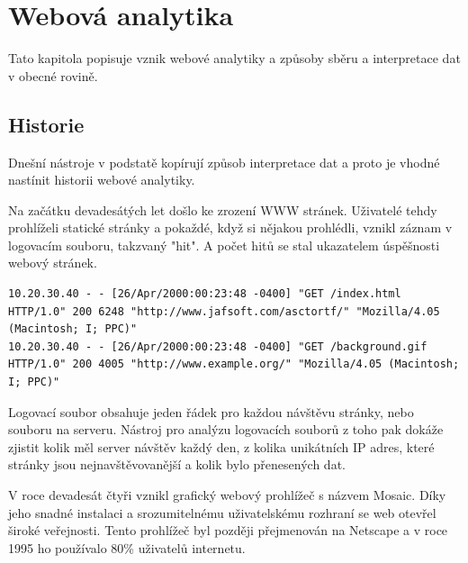 \documentclass[bc,male,java,dept456]{diploma}						%
\begin{document}

\section{Webová analytika}

Tato kapitola popisuje vznik webové analytiky a způsoby sběru a interpretace dat v obecné rovině. 



\subsection{Historie}


Dnešní nástroje v podstatě kopírují způsob interpretace dat a proto je vhodné nastínit historii webové analytiky.

Na začátku devadesátých let došlo ke zrození WWW stránek. Uživatelé tehdy pro\-hlí\-želi statické stránky a pokaždé, když si nějakou prohlédli, vznikl záznam v logovacím souboru, takzvaný "hit". A počet hitů se stal ukazatelem úspěšnosti webový stránek.

\bigskip

\begin{lstlisting}[label=src:Plain,caption=Ukázka záznamu z logovacího souboru]
10.20.30.40 - - [26/Apr/2000:00:23:48 -0400] "GET /index.html HTTP/1.0" 200 6248 "http://www.jafsoft.com/asctortf/" "Mozilla/4.05 (Macintosh; I; PPC)"
10.20.30.40 - - [26/Apr/2000:00:23:48 -0400] "GET /background.gif HTTP/1.0" 200 4005 "http://www.example.org/" "Mozilla/4.05 (Macintosh; I; PPC)"
\end{lstlisting}

\bigskip

Logovací soubor obsahuje jeden řádek pro každou návštěvu stránky, nebo souboru na serveru. Nástroj pro analýzu logovacích souborů z toho pak dokáže zjistit kolik měl server návštěv každý den, z kolika unikátních IP adres, které stránky jsou nej\-na\-vště\-vo\-va\-něj\-ší a kolik bylo přenesených dat.

V roce devadesát čtyři vznikl grafický webový prohlížeč s názvem Mosaic. Díky jeho snadné instalaci a srozumitelnému uživatelskému rozhraní se web otevřel široké veřejnosti. Tento prohlížeč byl později přejmenován na Netscape a v roce 1995 ho po\-u\-ží\-va\-lo 80\% uživatelů internetu.
\end{document}
